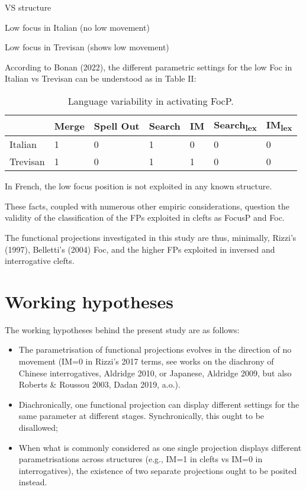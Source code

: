 \documentclass[fleqn,10pt]{wlscirep}
\begin{document}
\begin{exe}
    \ex VS structure
\end{exe}

\begin{exe}
    \ex Low focus in Italian (no low movement)
\end{exe}

\begin{exe}
    \ex Low focus in Trevisan (shows low movement)
\end{exe}

According to Bonan (2022), the different parametric settings for the low Foc in Italian vs Trevisan can be understood as in Table II:

\begin{table}[ht]
    \centering
    \begin{tabular}{|l|l|l|l|l|l|l|}
    \hline
     & Merge & Spell Out & Search & IM & Search\textsubscript{lex} & IM\textsubscript{lex} \\
    \hline
    Italian & 1 & 0 & 1 & 0 & 0 & 0 \\
    \hline
    Trevisan & 1 & 0 & 1 & 1 & 0 & 0\\
    \hline
    \end{tabular}
    \caption{\label{tab:samp2}Language variability in activating FocP.}
    \end{table}

In French, the low focus position is not exploited in any known structure. 

These facts, coupled with numerous other empiric considerations, question the validity of the classification of the FPs exploited in clefts as FocusP and Foc. 

The functional projections investigated in this study are thus, minimally, Rizzi’s (1997), Belletti’s (2004) Foc, and the higher FPs exploited in inversed and interrogative clefts.

\begin{exe}
    \ex 
\end{exe}

\section*{Working hypotheses}
The working hypotheses behind the present study are as follows:

\begin{itemize}
\item The parametrisation of functional projections evolves in the direction of no movement (IM=0 in Rizzi’s 2017 terms, see works on the diachrony of Chinese interrogatives, Aldridge 2010, or Japanese, Aldridge 2009, but also Roberts & Roussou 2003, Dadan 2019, a.o.).
\item Diachronically, one functional projection can display different settings for the same parameter at different stages. Synchronically, this ought to be disallowed;
\item When what is commonly considered as one single projection displays different parametrisations across structures (e.g., IM=1 in clefts vs IM=0 in interrogatives), the existence of two separate projections ought to be posited instead.
\end{itemize}
\end{document}
